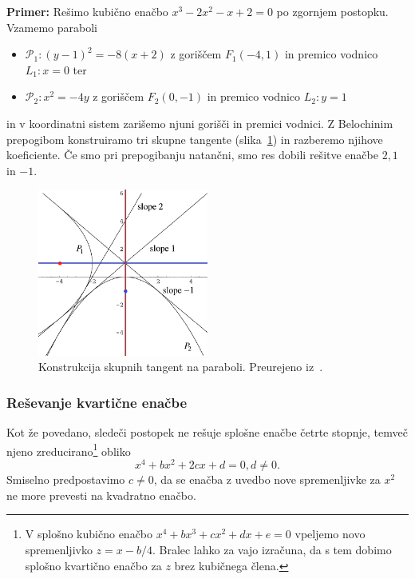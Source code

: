 \textbf{Primer:} Rešimo kubično enačbo $x^3 - 2x^2 - x + 2 = 0$ po zgornjem postopku. Vzamemo paraboli
\begin{itemize}
    \item $\mathcal{P}_1: (y-1)^2 = -8(x+2)$ z goriščem $F_1 (-4, 1)$ in premico vodnico $L_1: x = 0$ ter
    \item $\mathcal{P}_2: x^2 = -4y$ z goriščem $F_2 (0, -1)$ in premico vodnico $L_2: y = 1$
\end{itemize}
in v koordinatni sistem zarišemo njuni gorišči in premici vodnici. Z Belochinim prepogibom konstruiramo tri skupne tangente (slika~\ref{fig:kubicna_tang_primer}) in razberemo njihove koeficiente. Če smo pri prepogibanju natančni, smo res dobili rešitve enačbe $2, 1$ in $-1$.

\begin{figure}[h]
    \centering
    \includegraphics[width=0.5\textwidth]{images/kubicna_tang_primer1.png}
    \caption[Primer reševanja kubične enačbe s tangentami]{Konstrukcija skupnih tangent na paraboli. Preurejeno iz~\cite[str.\ 22]{edwards2001}.}
    \label{fig:kubicna_tang_primer}
\end{figure}

\subsubsection*{Reševanje kvartične enačbe}

Kot že povedano, sledeči postopek ne rešuje splošne enačbe četrte stopnje, temveč njeno zreducirano\footnote{V splošno kubično enačbo $x^4 + bx^3 + cx^2 + dx + e = 0$ vpeljemo novo spremenljivko $z = x - b/4$. Bralec lahko za vajo izračuna, da s tem dobimo splošno kvartično enačbo za $z$ brez kubičnega člena.} obliko
\begin{equation}
    \label{eq:reduc_kvart_ev}
    x^4 + bx^2 + 2cx + d = 0, d \neq 0.
\end{equation}
Smiselno predpostavimo $c \neq 0$, da se enačba z uvedbo nove spremenljivke za $x^2$ ne more prevesti na kvadratno enačbo.

